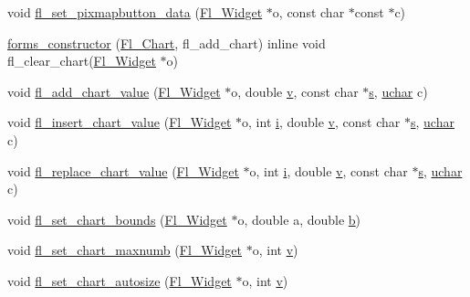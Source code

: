 \begin{DoxyCompactItemize}
\item 
void \hyperlink{forms_8_h_a07a2174480f5e34bf76806bf14cc5088}{fl\+\_\+set\+\_\+pixmapbutton\+\_\+data} (\hyperlink{class_fl___widget}{Fl\+\_\+\+Widget} $\ast$o, const char $\ast$const $\ast$c)
\item 
\hyperlink{forms_8_h_a5977b1074c3f616706623acfb958ec6c}{forms\+\_\+constructor} (\hyperlink{class_fl___chart}{Fl\+\_\+\+Chart}, fl\+\_\+add\+\_\+chart) inline void fl\+\_\+clear\+\_\+chart(\hyperlink{class_fl___widget}{Fl\+\_\+\+Widget} $\ast$o)
\item 
void \hyperlink{forms_8_h_a37311073eaa0582679e5db508bf7c917}{fl\+\_\+add\+\_\+chart\+\_\+value} (\hyperlink{class_fl___widget}{Fl\+\_\+\+Widget} $\ast$o, double \hyperlink{forms_8_h_a3b90d5a73541ab9402511d87bed076ef}{v}, const char $\ast$\hyperlink{forms_8_h_a672b4f0a8c8a6db61068c721f799d87f}{s}, \hyperlink{fl__types_8h_a65f85814a8290f9797005d3b28e7e5fc}{uchar} c)
\item 
void \hyperlink{forms_8_h_aaf5b7815b28beab20f4e5104381949e8}{fl\+\_\+insert\+\_\+chart\+\_\+value} (\hyperlink{class_fl___widget}{Fl\+\_\+\+Widget} $\ast$o, int \hyperlink{forms_8_h_acb559820d9ca11295b4500f179ef6392}{i}, double \hyperlink{forms_8_h_a3b90d5a73541ab9402511d87bed076ef}{v}, const char $\ast$\hyperlink{forms_8_h_a672b4f0a8c8a6db61068c721f799d87f}{s}, \hyperlink{fl__types_8h_a65f85814a8290f9797005d3b28e7e5fc}{uchar} c)
\item 
void \hyperlink{forms_8_h_a391d8c0a39bd8d20af06408c83a9236e}{fl\+\_\+replace\+\_\+chart\+\_\+value} (\hyperlink{class_fl___widget}{Fl\+\_\+\+Widget} $\ast$o, int \hyperlink{forms_8_h_acb559820d9ca11295b4500f179ef6392}{i}, double \hyperlink{forms_8_h_a3b90d5a73541ab9402511d87bed076ef}{v}, const char $\ast$\hyperlink{forms_8_h_a672b4f0a8c8a6db61068c721f799d87f}{s}, \hyperlink{fl__types_8h_a65f85814a8290f9797005d3b28e7e5fc}{uchar} c)
\item 
void \hyperlink{forms_8_h_a60e6b1a372ea51177c0b010db68903a4}{fl\+\_\+set\+\_\+chart\+\_\+bounds} (\hyperlink{class_fl___widget}{Fl\+\_\+\+Widget} $\ast$o, double a, double \hyperlink{forms_8_h_a0ba06a290a384fa06b1b90745827dae2}{b})
\item 
void \hyperlink{forms_8_h_a2d417ef268c644805829d45657f09117}{fl\+\_\+set\+\_\+chart\+\_\+maxnumb} (\hyperlink{class_fl___widget}{Fl\+\_\+\+Widget} $\ast$o, int \hyperlink{forms_8_h_a3b90d5a73541ab9402511d87bed076ef}{v})
\item 
void \hyperlink{forms_8_h_a9243bcdb46430a2405731b1030733261}{fl\+\_\+set\+\_\+chart\+\_\+autosize} (\hyperlink{class_fl___widget}{Fl\+\_\+\+Widget} $\ast$o, int \hyperlink{forms_8_h_a3b90d5a73541ab9402511d87bed076ef}{v})

\end{DoxyCompactItemize}
